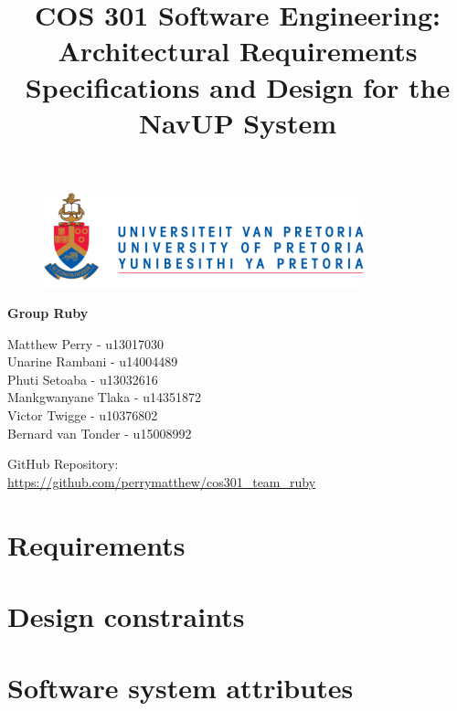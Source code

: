 \documentclass{article}
\begin{document}
		\begin{figure}[t]
			\centering
			\includegraphics[width=350px]{UP_Logo.PNG}
		\end{figure}
			\title{COS 301 Software Engineering: Architectural Requirements Specifications and Design for the NavUP System}
\maketitle
		\begin{center}
			\textbf{\newline Group Ruby} \\
		\end{center}
			
				
		\begin{flushright} \large
			Matthew Perry - u13017030 \\
			Unarine Rambani - u14004489  \\
			Phuti Setoaba -  u13032616\\
			Mankgwanyane Tlaka - u14351872  \\
			Victor Twigge -  u10376802\\
			Bernard van Tonder - u15008992  \\
		\end{flushright}
		
		
		
		
		GitHub Repository: \href{https://github.com/perrymatthew/cos301_team_ruby}\\
		\url{https://github.com/perrymatthew/cos301_team_ruby}
	

\clearpage
\tableofcontents

\clearpage
\section{Requirements}
	
\section{Design constraints}
	
\section{Software system attributes}
	
\clearpage
\end{document}
